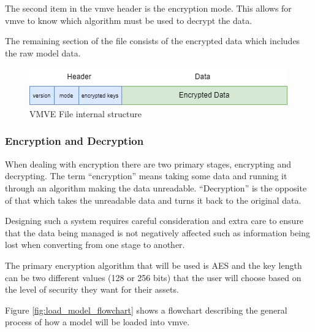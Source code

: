 \documentclass[11pt]{article}
\begin{document}
The second item in the \gls*{vmve} header is the encryption mode. This allows for
\gls*{vmve} to know which algorithm must be used to decrypt the data.

The remaining section of the file consists of the encrypted data which includes
the raw model data.

\begin{figure}[H]
  \centering
  \includegraphics[width=\textwidth]{images/vmve_file_structure.png}
  \caption{VMVE File internal structure}
  \label{fig:vmve_file_structure}
\end{figure}


\subsubsection{Encryption and Decryption}
When dealing with encryption there are two primary stages, encrypting and
decrypting. The term ``encryption'' means taking some data and running it
through an algorithm making the data unreadable. ``Decryption'' is the opposite
of that which takes the unreadable data and turns it back to the original data.

Designing such a system requires careful consideration and extra care to ensure
that the data being managed is not negatively affected such as information being
lost when converting from one stage to another.

The primary encryption algorithm that will be used is AES and the key length can
be two different values (128 or 256 bits) that the user will choose based on the
level of security they want for their assets.

Figure \ref{fig:load_model_flowchart} shows a flowchart describing the general
process of how a model will be loaded into \gls*{vmve}.
\end{document}

